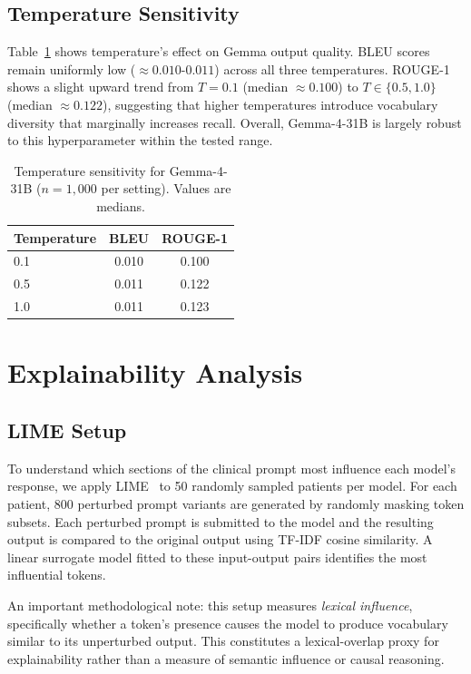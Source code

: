 \documentclass[10pt, twocolumn, a4paper]{article}
\begin{document}
\subsection{Temperature Sensitivity}

Table~\ref{tab:temperature} shows temperature's effect on Gemma output quality. BLEU scores remain uniformly low ($\approx 0.010$-$0.011$) across all three temperatures. ROUGE-1 shows a slight upward trend from $T = 0.1$ (median $\approx 0.100$) to $T \in \{0.5, 1.0\}$ (median $\approx 0.122$), suggesting that higher temperatures introduce vocabulary diversity that marginally increases recall. Overall, Gemma-4-31B is largely robust to this hyperparameter within the tested range.

\begin{table}[h]
\centering
\caption{Temperature sensitivity for Gemma-4-31B ($n = 1{,}000$ per setting). Values are medians.}
\label{tab:temperature}
\small
\begin{tabular}{lcc}
\toprule
\textbf{Temperature} & \textbf{BLEU} & \textbf{ROUGE-1} \\
\midrule
0.1 & 0.010 & 0.100 \\
0.5 & 0.011 & 0.122 \\
1.0 & 0.011 & 0.123 \\
\bottomrule
\end{tabular}
\end{table}

\section{Explainability Analysis}

\subsection{LIME Setup}
To understand which sections of the clinical prompt most influence each model's response, we apply LIME~\cite{lime} to 50 randomly sampled patients per model. For each patient, 800 perturbed prompt variants are generated by randomly masking token subsets. Each perturbed prompt is submitted to the model and the resulting output is compared to the original output using TF-IDF cosine similarity. A linear surrogate model fitted to these input-output pairs identifies the most influential tokens.

An important methodological note: this setup measures \textit{lexical influence}, specifically whether a token's presence causes the model to produce vocabulary similar to its unperturbed output. This constitutes a lexical-overlap proxy for explainability rather than a measure of semantic influence or causal reasoning.
\end{document}
